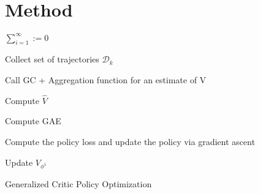 \section{Method}

\begin{algorithm}[H]
\DontPrintSemicolon
  
  $\sum_{i=1}^{\infty} := 0$
    {
        Collect set of trajectories $\mathcal{D}_k$
        
        Call GC + Aggregation function for an estimate of V

        Compute $\hat{V}$

        Compute GAE

        Compute the policy loss and update the policy via gradient ascent
         
    }
    {
    	Update $V_{\phi^1}$	
    } 
    
\caption{Generalized Critic Policy Optimization}
\end{algorithm}